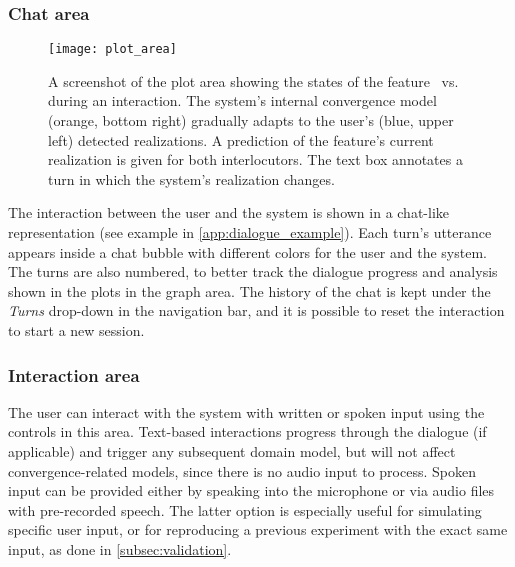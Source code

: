 \subsubsection{Chat area}
\label{subsubsec:chat_area}

\begin{figure}[t]
	\centering
	\texttt{[image: plot\_area]}
	\caption[Real-time visualization of phonetic changes]{A screenshot of the plot area showing the states of the feature \textipa{[E:]}~vs.~\textipa{[e:]} during an interaction.
		The system's internal convergence model (orange, bottom right) gradually adapts to the user's (blue, upper left) detected realizations.
		A prediction of the feature's current realization is given for both interlocutors.
		The text box annotates a turn in which the system's realization changes.}
	\label{fig:plot}
\end{figure}

The interaction between the user and the system is shown in a chat-like representation (see example in \cref{app:dialogue_example}).
Each turn's utterance appears inside a chat bubble with different colors for the user and the system.
The turns are also numbered, to better track the dialogue progress and analysis shown in the plots in the graph area.
The history of the chat is kept under the \emph{Turns} drop-down in the navigation bar, and it is possible to reset the interaction to start a new session.

\subsubsection{Interaction area}
\label{subsubsec:interaction_area}

The user can interact with the system with written or spoken input using the controls in this area.
Text-based interactions progress through the dialogue (if applicable) and trigger any subsequent domain model, but will not affect convergence-related models, since there is no audio input to process.
Spoken input can be provided either by speaking into the microphone or via audio files with pre-recorded speech.
The latter option is especially useful for simulating specific user input, or for reproducing a previous experiment with the exact same input, as done in \cref{subsec:validation}.


